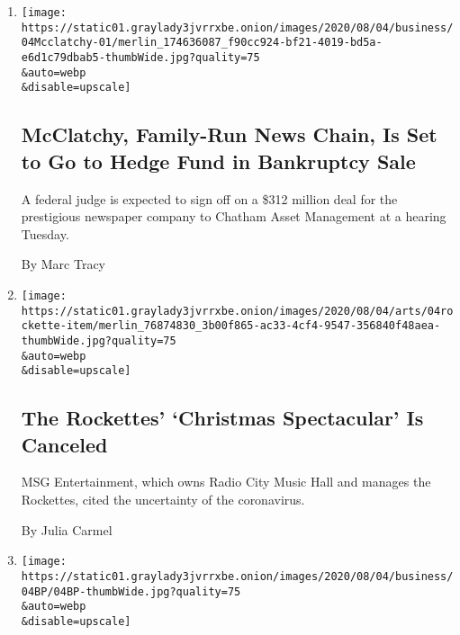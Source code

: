 \begin{enumerate}
\def\labelenumi{\arabic{enumi}.}
\item
  \href{/2020/08/04/business/media/mcclatchy-newspapers-bankrutpcy-chatham.html}{}

  \texttt{[image: https://static01.graylady3jvrrxbe.onion/images/2020/08/04/business/04Mcclatchy-01/merlin\_174636087\_f90cc924-bf21-4019-bd5a-e6d1c79dbab5-thumbWide.jpg?quality=75\\\&auto=webp\\\&disable=upscale]}

  \hypertarget{mcclatchy-family-run-news-chain-is-set-to-go-to-hedge-fund-in-bankruptcy-sale}{%
  \subsection{McClatchy, Family-Run News Chain, Is Set to Go to Hedge
  Fund in Bankruptcy
  Sale}\label{mcclatchy-family-run-news-chain-is-set-to-go-to-hedge-fund-in-bankruptcy-sale}}

  A federal judge is expected to sign off on a \$312 million deal for
  the prestigious newspaper company to Chatham Asset Management at a
  hearing Tuesday.

  By Marc Tracy
\item
  \href{/2020/08/04/theater/radio-city-rockettes-christmas-canceled.html}{}

  \texttt{[image: https://static01.graylady3jvrrxbe.onion/images/2020/08/04/arts/04rockette-item/merlin\_76874830\_3b00f865-ac33-4cf4-9547-356840f48aea-thumbWide.jpg?quality=75\\\&auto=webp\\\&disable=upscale]}

  \hypertarget{the-rockettes-christmas-spectacular-is-canceled}{%
  \subsection{The Rockettes' `Christmas Spectacular' Is
  Canceled}\label{the-rockettes-christmas-spectacular-is-canceled}}

  MSG Entertainment, which owns Radio City Music Hall and manages the
  Rockettes, cited the uncertainty of the coronavirus.

  By Julia Carmel
\item
  \href{/2020/08/04/business/energy-environment/bp-renewable-investment.html}{}

  \texttt{[image: https://static01.graylady3jvrrxbe.onion/images/2020/08/04/business/04BP/04BP-thumbWide.jpg?quality=75\\\&auto=webp\\\&disable=upscale]}

  \hypertarget{bp-reports-a-huge-loss-and-vows-to-increase-renewable-investment}{%
}
\end{enumerate}
